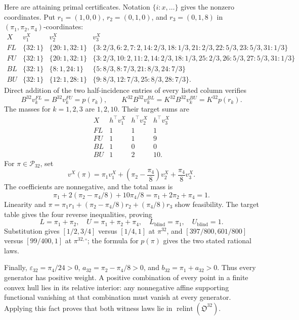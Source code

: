 Here are attaining primal certificates.  Notation \(\{i:x,\ldots\}\) gives the nonzero coordinates.  Put \(r_1=(1,0,0)\), \(r_2=(0,1,0)\), and \(r_3=(0,1,8)\) in \((\pi_1,\pi_2,\pi_4)\)-coordinates:
\[
\begin{array}{c|c|c|l}
X&v_1^X&v_2^X&v_3^X\\\hline
FL&\{32:1\}&\{20:1,32:1\}&
\{3:2/3,6:2,7:2,14:2/3,18:1/3,21:2/3,22:5/3,23:5/3,31:1/3\}\\
FU&\{32:1\}&\{20:1,32:1\}&
\{3:2/3,10:2,11:2,14:2/3,18:1/3,25:2/3,26:5/3,27:5/3,31:1/3\}\\
BL&\{32:1\}&\{8:1,24:1\}&
\{5:8/3,8:7/3,21:8/3,24:7/3\}\\
BU&\{32:1\}&\{12:1,28:1\}&
\{9:8/3,12:7/3,25:8/3,28:7/3\}.
\end{array}
\]
Direct addition of the two half-incidence entries of every listed column verifies
\[
B^{32}v_k^{FL}=B^{32}v_k^{FU}=p(r_k),\qquad
K^{32}B^{32}v_k^{BL}=K^{32}B^{32}v_k^{BU}=K^{32}p(r_k).
\]
The masses for \(k=1,2,3\) are \(1,2,10\).  Their target sums are
\[
\begin{array}{c|ccc}
X&h^{\top}v_1^X&h^{\top}v_2^X&h^{\top}v_3^X\\\hline
FL&1&1&1\\ FU&1&1&9\\ BL&1&0&0\\ BU&1&2&10.
\end{array}
\]
For \(\pi\in\mathcal P_{32}\), set
\[
v^X(\pi)=\pi_1v_1^X+\left(\pi_2-\frac{\pi_4}{8}\right)v_2^X
+\frac{\pi_4}{8}v_3^X.
\]
The coefficients are nonnegative, and the total mass is
\[
\pi_1+2(\pi_2-\pi_4/8)+10\pi_4/8=\pi_1+2\pi_2+\pi_4=1.
\]
Linearity and \(\pi=\pi_1r_1+(\pi_2-\pi_4/8)r_2+(\pi_4/8)r_3\) show feasibility.  The target table gives the four reverse inequalities, proving
\[
L=\pi_1+\pi_2,\quad U=\pi_1+\pi_2+\pi_4,\quad
L_{\mathrm{blind}}=\pi_1,\quad U_{\mathrm{blind}}=1.
\]
Substitution gives \([1/2,3/4]\) versus \([1/4,1]\) at \(\pi^{32}\), and \([397/800,601/800]\) versus \([99/400,1]\) at \(\pi^{32,\circ}\); the formula for \(p(\pi)\) gives the two stated rational laws.

Finally, \(\varepsilon_{32}=\pi_4/24>0\), \(a_{32}=\pi_2-\pi_4/8>0\), and \(b_{32}=\pi_1+a_{32}>0\).  Thus every generator has positive weight.  A positive combination of every point in a finite convex hull lies in its relative interior: any nonnegative affine supporting functional vanishing at that combination must vanish at every generator.  Applying this fact proves that both witness laws lie in \(\operatorname{relint}(\mathfrak O^{32})\).